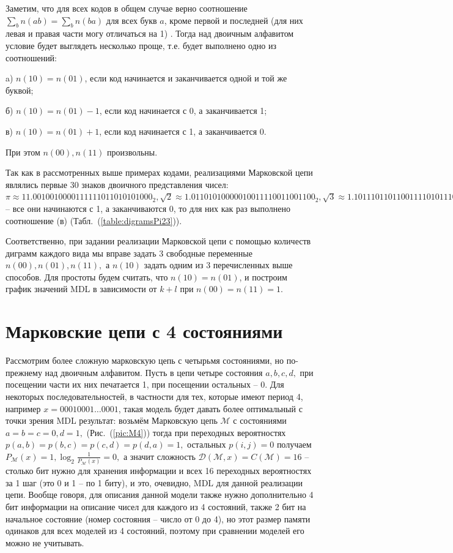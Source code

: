 \documentclass[12pt]{article}
\begin{document}
	Заметим, что для всех кодов в общем случае верно соотношение $\sum_b n(ab)=\sum_b n(ba)$ для всех букв $a$, кроме первой и последней (для них левая и правая части могу отличаться на 1) \cite[стр.~147]{teor_inf_ver}. Тогда над двоичным алфавитом условие будет выглядеть несколько проще, т.е. будет выполнено одно из соотношений:
	
	a) $n(10)=n(01)$, если код начинается и заканчивается одной и той же буквой;
	
	б) $n(10)=n(01)-1$, если код начинается с 0, а заканчивается 1;
	
	в) $n(10)=n(01)+1$, если код начинается с 1, а заканчивается 0.
	
	При этом $n(00),n(11)$ произвольны.
	
	Так как в рассмотренных выше примерах кодами, реализациями Марковской цепи являлись первые 30 знаков двоичного представления чисел: $\pi\approx11.0010010000111111011010101000_2, \sqrt{2}\approx1.01101010000010011110011001100_2,\sqrt{3}\approx1.10111011011001111010111010000$ -- все они начинаются с 1, а заканчиваются 0, то для них как раз выполнено соотношение (в) (Табл.~(\ref{table:digramsPi23})).
	
	Соответственно, при задании реализации Марковской цепи с помощью количеств диграмм каждого вида мы вправе задать 3 свободные переменные $n(00),n(01),n(11),$ а $n(10)$ задать одним из 3 перечисленных выше способов. Для простоты будем считать, что $n(10)=n(01)$, и построим график значений MDL в зависимости от $k+l$ при $n(00)=n(11)=1.$

	\section*{Марковские цепи с 4 состояниями}\label{chapter: M4states}
	Рассмотрим более сложную марковскую цепь с четырьмя состояниями, но по-прежнему над двоичным алфавитом. Пусть в цепи четыре состояния $a,b,c,d,$ при посещении части их них печатается 1, при посещении остальных -- 0. Для некоторых последовательностей, в частности для тех, которые имеют период 4, например $x=00010001\dots0001$, такая модель будет давать более оптимальный с точки зрения MDL результат: возьмём Марковскую цепь $\mathcal{M}$ с состояниями $a=b=c=0,d=1,$ (Рис.~(\ref{pic:M4})) тогда при переходных вероятностях $p(a,b)=p(b,c)=p(c,d)=p(d,a)=1,$ остальных $p(i,j)=0$ получаем $P_{\mathcal{M}}(x)=1,\log_2{\frac{1}{P_{\mathcal{M}}(x)}}=0,$ а значит сложность $\mathcal{D}(\mathcal{M},x)=C(\mathcal{M})=16$ -- столько бит нужно для хранения информации и всех 16 переходных вероятностях за 1 шаг (это 0 и 1 -- по 1 биту), и это, очевидно, MDL для данной реализации цепи. Вообще говоря, для описания данной модели также нужно дополнительно 4 бит информации на описание чисел для каждого из 4 состояний, также 2 бит на начальное состояние (номер состояния -- число от 0 до 4), но этот размер памяти одинаков для всех моделей из 4 состояний, поэтому при сравнении моделей его можно не учитывать. 
	
\end{document}
